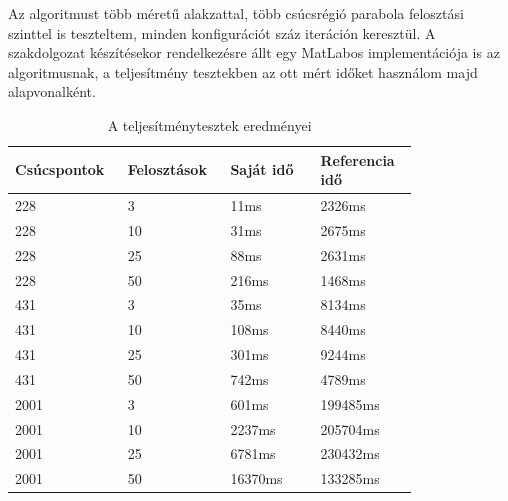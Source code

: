 Az algoritmust több méretű alakzattal, több csúcsrégió parabola felosztási szinttel is teszteltem, minden konfigurációt száz iteráción keresztül. A szakdolgozat készítésekor rendelkezésre állt egy MatLabos implementációja is az algoritmusnak, a teljesítmény tesztekben az ott mért időket használom majd alapvonalként.

\begin{table}[H]
    \centering
    \begin{tabular}{ | m{0.2\linewidth} | m{0.2\linewidth} | m{0.2\linewidth} | m{0.2\linewidth} | }
        \hline
        \textbf{Csúcspontok} & \textbf{Felosztások}  & \textbf{Saját idő}  & \textbf{Referencia idő} \\
        \hline \hline
        228 & 3 & 11ms & 2326ms \\
        \hline
        228 & 10 & 31ms & 2675ms \\
        \hline
        228 & 25 & 88ms & 2631ms \\
        \hline
        228 & 50 & 216ms & 1468ms \\
        \hline
        431 & 3 & 35ms & 8134ms \\
        \hline
        431 & 10 & 108ms & 8440ms \\
        \hline
        431 & 25 & 301ms & 9244ms \\
        \hline
        431 & 50 & 742ms & 4789ms \\
        \hline
        2001 & 3 & 601ms & 199485ms \\
        \hline
        2001 & 10 & 2237ms & 205704ms \\
        \hline
        2001 & 25 & 6781ms & 230432ms \\
        \hline
        2001 & 50 & 16370ms & 133285ms \\
        \hline
    \end{tabular}
    \caption{A teljesítménytesztek eredményei}
    \label{tab:benchmarks}
\end{table}
